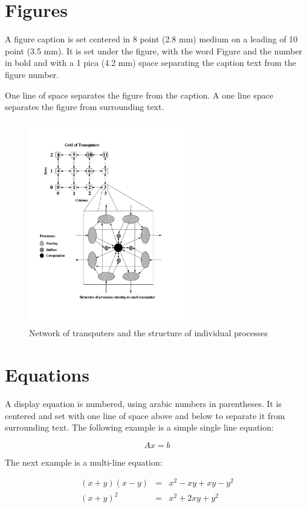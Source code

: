 \documentclass{ecai}
\begin{document}
\section{Figures}
A figure caption is set centered in 8 point (2.8 mm) medium on a
leading of 10 point (3.5 mm).  It is set under the figure, with the
word Figure and the number in bold and with a 1 pica (4.2 mm) space
separating the caption text from the figure number.

One line of space separates the figure from the caption. A one line
space separates the figure from surrounding text.

\begin{figure}
\centerline{\includegraphics[height=3.5in]{ecaif01}}
\caption{Network of transputers and the structure of individual
processes } \label{procstructfig}
\end{figure}

\section{Equations}
A display equation is numbered, using arabic numbers in parentheses.
It is centered and set with one line of space above and below to
separate it from surrounding text. The following example is a simple
single line equation:

\begin{equation}
Ax=b
\label{thesystem}
\end{equation}

The next example is a multi-line equation:

\begin{eqnarray}
(x+y)(x-y) & = & x^2-xy+xy-y^2\\
(x+y)^2    & = & x^2+2xy+y^2
\end{eqnarray}
\end{document}
